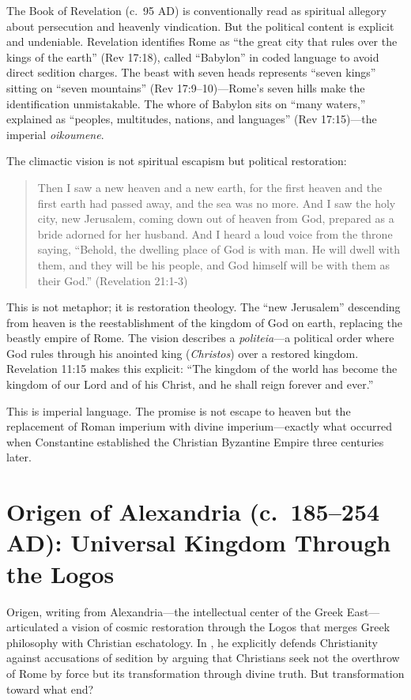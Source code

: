 The Book of Revelation (c.~95 AD) is conventionally read as spiritual allegory about persecution and heavenly vindication.
But the political content is explicit and undeniable.
Revelation identifies Rome as ``the great city that rules over the kings of the earth'' (Rev 17:18), called ``Babylon'' in coded language to avoid direct sedition charges.
The beast with seven heads represents ``seven kings'' sitting on ``seven mountains'' (Rev 17:9--10)---Rome's seven hills make the identification unmistakable.
The whore of Babylon sits on ``many waters,'' explained as ``peoples, multitudes, nations, and languages'' (Rev 17:15)---the imperial \emph{oikoumene}.

The climactic vision is not spiritual escapism but political restoration:

\begin{quote}
Then I saw a new heaven and a new earth, for the first heaven and the first earth had passed away, and the sea was no more.
And I saw the holy city, new Jerusalem, coming down out of heaven from God, prepared as a bride adorned for her husband.
And I heard a loud voice from the throne saying, ``Behold, the dwelling place of God is with man. He will dwell with them, and they will be his people, and God himself will be with them as their God.'' (Revelation 21:1-3)
\end{quote}

This is not metaphor; it is restoration theology.
The ``new Jerusalem'' descending from heaven is the reestablishment of the kingdom of God on earth, replacing the beastly empire of Rome.
The vision describes a \emph{politeia}---a political order where God rules through his anointed king (\emph{Christos}) over a restored kingdom.
Revelation 11:15 makes this explicit: ``The kingdom of the world has become the kingdom of our Lord and of his Christ, and he shall reign forever and ever.''

This is imperial language.
The promise is not escape to heaven but the replacement of Roman imperium with divine imperium---exactly what occurred when Constantine established the Christian Byzantine Empire three centuries later.

\section{Origen of Alexandria (c.~185--254 AD): Universal Kingdom Through the Logos}\label{sec:origen-universal-kingdom}

Origen, writing from Alexandria---the intellectual center of the Greek East---articulated a vision of cosmic restoration through the Logos that merges Greek philosophy with Christian eschatology.
In \cite[8.68--75]{origen:contracels}, he explicitly defends Christianity against accusations of sedition by arguing that Christians seek not the overthrow of Rome by force but its transformation through divine truth.
But transformation toward what end?

